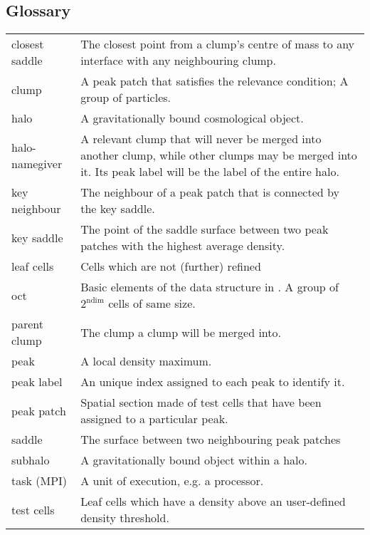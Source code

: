 \begin{appendices}
\setcounter{equation}{0}
\renewcommand{\theequation}{\Alph{section}.\arabic{equation}}

\section{Glossary}\label{app:glossary}
\begin{center}
	\begin{tabular}[c]{p{3cm} p{12cm}}
		closest saddle &
			The closest point from a clump's centre of mass to any interface with any neighbouring clump.\\[.5em]
		clump		& 
			A peak patch that satisfies the relevance condition; A group of particles.\\[.5em]
		halo		&
			A gravitationally bound cosmological object.\\[.5em]
		halo-namegiver & 
			A relevant clump that will never be merged into another clump, while other clumps may be merged into it. Its peak label will be the label of the entire halo.\\[.5em]
		key neighbour &	
			The neighbour of a peak patch that is connected by the key saddle.\\[.5em]
		key saddle	& 	
			The point of the saddle surface between two peak patches with the highest average density.\\[.5em]
		leaf cells	&	
			Cells which are not (further) refined\\[.5em]
		oct			&	
			Basic elements of the data structure in \ramses. A group of $2^{\text{ndim}}$ cells of same size.\\[.5em]
		parent clump &	
			The clump a clump will be merged into. \\[.5em]
		peak		&	
			A local density maximum.\\[.5em]
		peak label	&	
			An unique index assigned to each peak to identify it.\\[.5em]
		peak patch	&	
			Spatial section made of test cells that have been assigned to a particular peak.\\[.5em]
		saddle		&	
			The surface between two neighbouring peak patches \\[.5em] 
		subhalo		&
			A gravitationally bound object within a halo.\\[.5em]
		task (MPI)	&
			A unit of execution, e.g. a processor.\\[.5em]
		test cells	&	
			Leaf cells which have a density above an user-defined density threshold.\\[.5em]
	\end{tabular}
\end{center}













\end{appendices}
